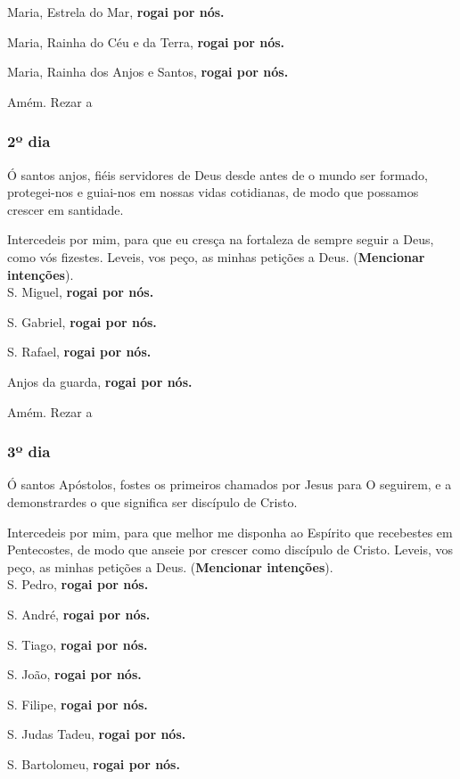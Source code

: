 \documentclass[a4paper,14pt]{extarticle} \usepackage[utf8]{inputenc}
\begin{document}
Maria, Estrela do Mar, \textbf{rogai por nós.}

Maria, Rainha do Céu e da Terra, \textbf{rogai por nós.}

Maria, Rainha dos Anjos e Santos, \textbf{rogai por nós.}

Amém. Rezar a 

\subsubsection{2º dia}

Ó santos anjos, fiéis servidores de Deus desde antes de o mundo ser formado, protegei-nos e guiai-nos em nossas vidas cotidianas, de modo que possamos crescer em santidade.

Intercedeis por mim, para que eu cresça na fortaleza de sempre seguir a Deus, como vós fizestes. Leveis, vos peço, as minhas petições a Deus. (\textbf{Mencionar intenções}).\\

S. Miguel, \textbf{rogai por nós.}

S. Gabriel, \textbf{rogai por nós.}

S. Rafael, \textbf{rogai por nós.}

Anjos da guarda, \textbf{rogai por nós.}

Amém. Rezar a 
\subsubsection{3º dia}

Ó santos Apóstolos, fostes os primeiros chamados por Jesus para O seguirem, e a demonstrardes o que significa ser discípulo de Cristo.

Intercedeis por mim, para que melhor me disponha ao Espírito que recebestes em Pentecostes, de modo que anseie por crescer como discípulo de Cristo. Leveis, vos peço, as minhas petições a Deus. (\textbf{Mencionar intenções}).\\

S. Pedro, \textbf{rogai por nós.}

S. André, \textbf{rogai por nós.}

S. Tiago, \textbf{rogai por nós.}

S. João, \textbf{rogai por nós.}

S. Filipe, \textbf{rogai por nós.}

S. Judas Tadeu, \textbf{rogai por nós.}

S. Bartolomeu, \textbf{rogai por nós.}
\end{document}
